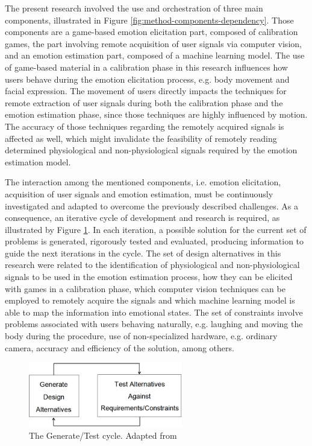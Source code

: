 The present research involved the use and orchestration of three main components, illustrated in Figure \ref{fig:method-components-dependency}. Those components are a game-based emotion elicitation part, composed of calibration games, the part involving remote acquisition of user signals via computer vision, and an emotion estimation part, composed of a machine learning model. The use of game-based material in a calibration phase in this research influences how users behave during the emotion elicitation process, e.g. body movement and facial expression. The movement of users directly impacts the techniques for remote extraction of user signals during both the calibration phase and the emotion estimation phase, since those techniques are highly influenced by motion. The accuracy of those techniques regarding the remotely acquired signals is affected as well, which might invalidate the feasibility of remotely reading determined physiological and non-physiological signals required by the emotion estimation model.

The interaction among the mentioned components, i.e. emotion elicitation, acquisition of user signals and emotion estimation, must be continuously investigated and adapted to overcome the previously described challenges. As a consequence, an iterative cycle of development and research is required, as illustrated by Figure \ref{fig:hevner-generate-test}. In each iteration, a possible solution for the current set of problems is generated, rigorously tested and evaluated, producing information to guide the next iterations in the cycle. The set of design alternatives in this research were related to the identification of physiological and non-physiological signals to be used in the emotion estimation process, how they can be elicited with games in a calibration phase, which computer vision techniques can be employed to remotely acquire the signals and which machine learning model is able to map the information into emotional states. The set of constraints involve problems associated with users behaving naturally, e.g. laughing and moving the body during the procedure, use of non-specialized hardware, e.g. ordinary camera, accuracy and efficiency of the solution, among others.

\begin{figure}[h]
    \centering
    \includegraphics[width=0.6\textwidth]{Content/figures/hevner-generate-test.png}
    \caption{The Generate/Test cycle. Adapted from \textcite{hevner2004design}}
    \label{fig:hevner-generate-test}
\end{figure}

